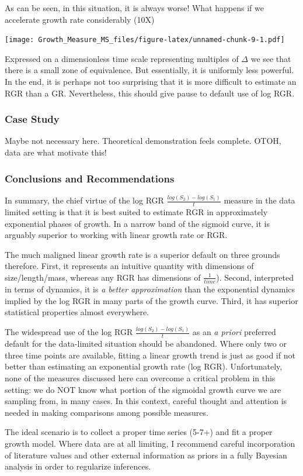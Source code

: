 \documentclass[]{article}
\begin{document}
As can be seen, in this situation, it is always worse! What happens if
we accelerate growth rate considerably (10X)

\texttt{[image: Growth\_Measure\_MS\_files/figure-latex/unnamed-chunk-9-1.pdf]}

Expressed on a dimensionless time scale representing multiples of
\(\Delta\) we see that there is a small zone of equivalence. But
essentially, it is uniformly less powerful. In the end, it is perhaps
not too surprising that it is more difficult to estimate an RGR than a
GR. Nevertheless, this should give pause to default use of log RGR.

\subsubsection{Case Study}\label{case-study}

Maybe not necessary here. Theoretical demonstration feels complete.
OTOH, data are what motivate this!

\subsubsection{Conclusions and
Recommendations}\label{conclusions-and-recommendations}

In summary, the chief virtue of the log RGR
\(\frac{log(S_2) - log(S_1)}{t}\) measure in the data limited setting is
that it is best suited to estimate RGR in approximately exponential
phases of growth. In a narrow band of the sigmoid curve, it is arguably
superior to working with linear growth rate or RGR.

The much maligned linear growth rate is a superior default on three
grounds therefore. First, it represents an intuitive quantity with
dimensions of size/length/mass, whereas any RGR has dimensions of
\(\frac{1}{time}\)). Second, interpreted in terms of dynamics, it is
\emph{a better approximation} than the exponential dynamics implied by
the log RGR in many parts of the growth curve. Third, it has superior
statistical properties almost everywhere.

The widespread use of the log RGR \(\frac{log(S_2) - log(S_1)}{t}\) as
an \emph{a priori} preferred default for the data-limited situation
should be abandoned. Where only two or three time points are available,
fitting a linear growth trend is just as good if not better than
estimating an exponential growth rate (log RGR). Unfortunately, none of
the measures discussed here can overcome a critical problem in this
setting: we do NOT know what portion of the sigmoidal growth curve we
are sampling from, in many cases. In this context, careful thought and
attention is needed in making comparisons among possible measures.

The ideal scenario is to collect a proper time series (5-7+) and fit a
proper growth model. Where data are at all limiting, I recommend careful
incorporation of literature values and other external information as
priors in a fully Bayesian analysis in order to regularize inferences.
\end{document}
